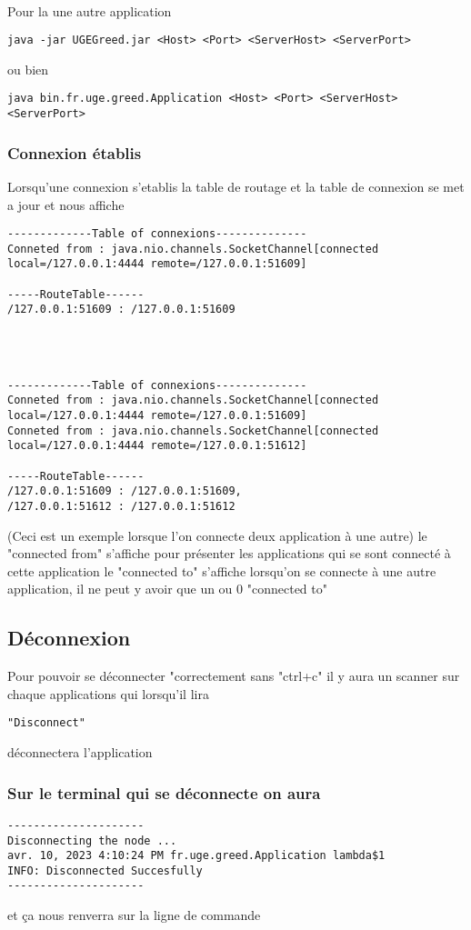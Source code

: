 \documentclass[a4paper,titlepage]{report}
\begin{document}
\paragraph{}
Pour la une autre application
\begin{lstlisting}
java -jar UGEGreed.jar <Host> <Port> <ServerHost> <ServerPort>
\end{lstlisting}
ou bien
\begin{lstlisting}
java bin.fr.uge.greed.Application <Host> <Port> <ServerHost> <ServerPort>
\end{lstlisting}
\subsubsection{Connexion établis}
Lorsqu'une connexion s'etablis la table de routage et la table de connexion se met a jour et nous affiche
\begin{lstlisting}
-------------Table of connexions--------------
Conneted from : java.nio.channels.SocketChannel[connected local=/127.0.0.1:4444 remote=/127.0.0.1:51609]

-----RouteTable------
/127.0.0.1:51609 : /127.0.0.1:51609




-------------Table of connexions--------------
Conneted from : java.nio.channels.SocketChannel[connected local=/127.0.0.1:4444 remote=/127.0.0.1:51609]
Conneted from : java.nio.channels.SocketChannel[connected local=/127.0.0.1:4444 remote=/127.0.0.1:51612]

-----RouteTable------
/127.0.0.1:51609 : /127.0.0.1:51609,
/127.0.0.1:51612 : /127.0.0.1:51612
\end{lstlisting}
(Ceci est un exemple lorsque l'on connecte deux application à une autre)
\linebreak
le "connected from" s'affiche pour présenter les applications qui se sont connecté à cette application
\linebreak
le "connected to" s'affiche lorsqu'on se connecte à une autre application, il ne peut y avoir que un ou 0 "connected to"
\subsection{Déconnexion}
Pour pouvoir se déconnecter "correctement sans "ctrl+c" il y aura un scanner sur chaque applications qui lorsqu'il lira 
\begin{lstlisting}
"Disconnect" 
\end{lstlisting}
déconnectera l'application 
\subsubsection{Sur le terminal qui se déconnecte on aura}
\begin{lstlisting}
---------------------
Disconnecting the node ...
avr. 10, 2023 4:10:24 PM fr.uge.greed.Application lambda$1
INFO: Disconnected Succesfully
---------------------
\end{lstlisting}
et ça nous renverra sur la ligne de commande
\end{document}
